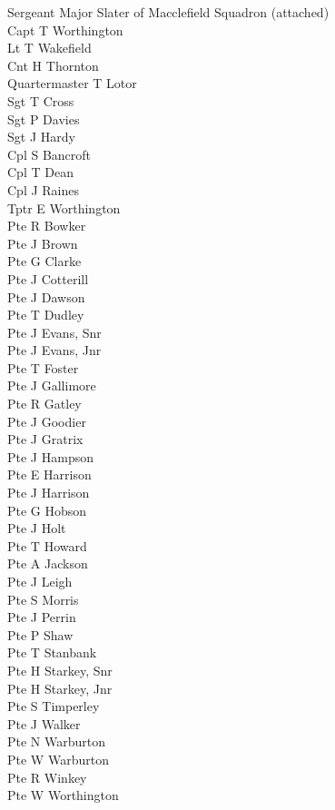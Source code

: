 \begin{multicols}{3}
  \small
  \noindent
  Sergeant Major Slater of Macclefield Squadron (attached) \\
  Capt T Worthington \\
  Lt T Wakefield \\
  Cnt H Thornton \\
  Quartermaster T Lotor \\
  Sgt T Cross \\
  Sgt P Davies \\
  Sgt J Hardy \\
  Cpl S Bancroft \\
  Cpl T Dean \\
  Cpl J Raines \\
  Tptr E Worthington \\
  Pte R Bowker \\
  Pte J Brown \\
  Pte G Clarke \\
  Pte J Cotterill \\
  Pte J Dawson \\
  Pte T Dudley \\
  Pte J Evans, Snr \\
  Pte J Evans, Jnr \\
  Pte T Foster \\
  Pte J Gallimore \\
  Pte R Gatley \\
  Pte J Goodier \\
  Pte J Gratrix \\
  Pte J Hampson \\
  Pte E Harrison \\
  Pte J Harrison \\
  Pte G Hobson \\
  Pte J Holt \\
  Pte T Howard \\
  Pte A Jackson \\
  Pte J Leigh \\
  Pte S Morris \\
  Pte J Perrin \\
  Pte P Shaw \\
  Pte T Stanbank \\
  Pte H Starkey, Snr \\
  Pte H Starkey, Jnr \\
  Pte S Timperley \\
  Pte J Walker \\
  Pte N Warburton \\
  Pte W Warburton \\
  Pte R Winkey \\
  Pte W Worthington \\
\end{multicols}

